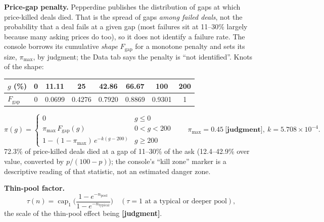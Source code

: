 \documentclass[11pt]{article}
\DeclareMathOperator{\capone}{cap}
\newcommand{\jud}{\textbf{[judgment]}}
\begin{document}
\textbf{Price-gap penalty.} Pepperdine publishes the distribution of gaps at which price-killed deals died. That is the spread of gaps \emph{among failed deals}, not the probability that a deal fails at a given gap (most failures sit at 11--30\% largely because many asking prices do too), so it does not identify a failure rate. The console borrows its cumulative \emph{shape} $F_{\text{gap}}$ for a monotone penalty and sets its size, $\pi_{\max}$, by judgment; the Data tab says the penalty is ``not identified''. Knots of the shape:
\begin{center}\small\begin{tabular}{lccccccc}\toprule
$g$ (\%) & 0 & 11.11 & 25 & 42.86 & 66.67 & 100 & 200\\\midrule
$F_{\text{gap}}$ & 0 & 0.0699 & 0.4276 & 0.7920 & 0.8869 & 0.9301 & 1\\\bottomrule\end{tabular}\end{center}
\begin{equation}
\pi(g)=\begin{cases}0 & g\le0\\ \pi_{\max}\,F_{\text{gap}}(g) & 0<g<200\\ 1-(1-\pi_{\max})\,e^{-k(g-200)} & g\ge200\end{cases}\qquad \pi_{\max}=0.45\ \jud,\ k=5.708\times10^{-4}.
\end{equation}
72.3\% of price-killed deals died at a gap of 11--30\% of the ask (12.4--42.9\% over value, converted by $p/(100-p)$); the console's ``kill zone'' marker is a descriptive reading of that statistic, not an estimated danger zone.

\textbf{Thin-pool factor.}
\begin{equation}
\tau(n)=\capone_1\!\Big(\frac{1-e^{-n_{\text{pool}}}}{1-e^{-n_{\text{typical}}}}\Big)\quad(\tau=1\text{ at a typical or deeper pool}),
\end{equation}
the scale of the thin-pool effect being \jud.
\end{document}
